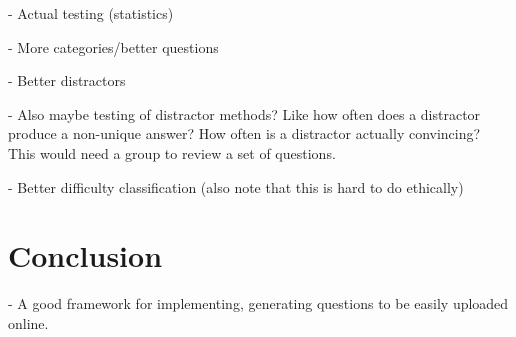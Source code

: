 \documentclass{article}
\begin{document}
- Actual testing (statistics)

- More categories/better questions

- Better distractors

- Also maybe testing of distractor methods? Like how often does a distractor produce a non-unique answer? How often is a distractor actually convincing? This would need a group to review a set of questions.

- Better difficulty classification (also note that this is hard to do ethically)

\section{Conclusion}

- A good framework for implementing, generating questions to be easily uploaded online. 
\end{document}
